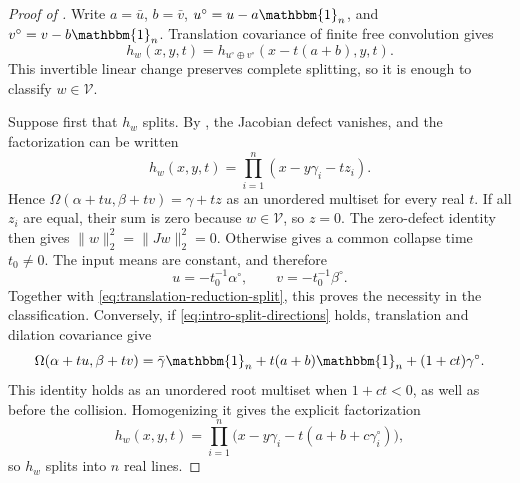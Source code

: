 \documentclass[12pt,reqno]{amsart}
\theoremstyle{definition}
\theoremstyle{remark}
\newcommand{\one}{\mathbbm{1}_n}
\begin{document}
\begin{proof}[Proof of ]
Write \(a=\bar u\), \(b=\bar v\),
\(u^\circ=u-a\one\), and \(v^\circ=v-b\one\).  Translation covariance of
finite free convolution gives
\begin{equation}\label{eq:translation-reduction-split}
 h_w(x,y,t)=h_{u^\circ\oplus v^\circ}
              (x-t(a+b),y,t).
\end{equation}
This invertible linear change preserves complete splitting, so it is enough
to classify \(w\in\mathcal V\).

Suppose first that \(h_w\) splits.  By
, the Jacobian defect vanishes, and the
factorization can be written
\begin{equation}\label{eq:global-affine-roots}
 h_w(x,y,t)=\prod_{i=1}^n(x-y\gamma_i-tz_i).
\end{equation}
Hence \(\Omega(\alpha+tu,\beta+tv)=\gamma+tz\) as an unordered multiset
for every real \(t\).  If all \(z_i\) are equal, their sum is zero because
\(w\in\mathcal V\), so \(z=0\).  The zero-defect identity then gives
\(\lVert w\rVert_2^2=\lVert Jw\rVert_2^2=0\).  Otherwise
 gives a common collapse time \(t_0\ne0\).
The input means are constant, and therefore
\begin{equation}\label{eq:radial-split-direction}
 u=-t_0^{-1}\alpha^\circ,
 \qquad v=-t_0^{-1}\beta^\circ.
\end{equation}
Together with \eqref{eq:translation-reduction-split}, this proves the
necessity in the classification.  Conversely, if
\eqref{eq:intro-split-directions} holds, translation and dilation covariance
give
\begin{equation}\label{eq:affine-output-radial-input}
 \Omega(\alpha+tu,\beta+tv)
 =\bar\gamma\one+t(a+b)\one+(1+ct)\gamma^\circ.
\end{equation}
This identity holds as an unordered root multiset when \(1+ct<0\),
as well as before the collision.  Homogenizing it gives the explicit factorization
\begin{equation}\label{eq:radial-split-factorization}
 h_w(x,y,t)=\prod_{i=1}^n
 \bigl(x-y\gamma_i-t(a+b+c\gamma_i^\circ)\bigr),
\end{equation}
so \(h_w\) splits into \(n\) real lines.
\end{proof}
\end{document}
